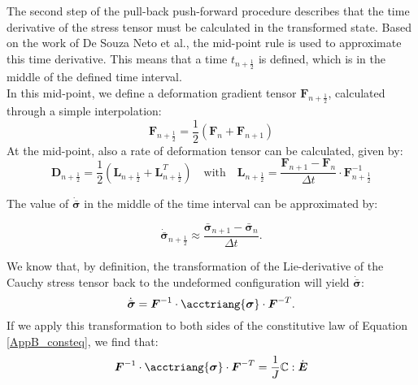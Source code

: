 {{The second step of the pull-back push-forward procedure describes that the time derivative of the stress tensor must be calculated in the transformed state.  Based on the work of De Souza Neto et al.\cite{compmethodsplasticity}{\color{red}{check this reference}}, the mid-point rule is used to approximate this time derivative. This means that a time $t_{n+\frac{1}{2}}$ is defined, which is in the middle of the defined time interval.\\
In this mid-point, we define a deformation gradient tensor $\boldsymbol{F}_{n+\frac{1}{2}}$, calculated through a simple interpolation:
\begin{equation}
\boldsymbol{F}_{n+\frac{1}{2}} = \frac{1}{2}(\boldsymbol{F}_{n}+\boldsymbol{F}_{n+1})
\end{equation}
At the mid-point, also a rate of deformation tensor can be calculated, given by:
\begin{equation}
\boldsymbol{D}_{n+\frac{1}{2}} = \frac{1}{2}(\boldsymbol{L}_{n+\frac{1}{2}}+\boldsymbol{L}_{n+\frac{1}{2}}^T)\quad\text{with}\quad \boldsymbol{L}_{n+\frac{1}{2}} = \frac{\boldsymbol{F}_{n+1}-\boldsymbol{F}_n}{\Delta t}\cdot \boldsymbol{F}_{n+\frac{1}{2}}^{-1}
\end{equation}

The value of $\dot{\bar{\boldsymbol{\sigma}}}$ in the middle of the time interval can be approximated by:
{\begin{equation}
\dot{\bar{\boldsymbol{\sigma}}}_{n+\frac{1}{2}}\approx\frac{\bar{\boldsymbol{\sigma}}_{n+1}-\bar{\boldsymbol{\sigma}}_{n}}{\Delta t}.
\end{equation}

We know that, by definition, the transformation of the Lie-derivative of the Cauchy stress tensor back to the undeformed configuration will yield $\dot{\bar{\boldsymbol{\sigma}}}$:
\begin{equation}
 \dot{\bar{\boldsymbol{\sigma}}}=\boldsymbol{F}^{-1}\cdot\acctriang{\boldsymbol{\sigma}}\cdot\boldsymbol{F}^{-T}.
\end{equation}
If we apply this transformation to both sides of the constitutive law of Equation \ref{AppB_consteq}, we find that:
\begin{equation}
\boldsymbol{F}^{-1}\cdot\acctriang{\boldsymbol{\sigma}}\cdot\boldsymbol{F}^{-T} = \frac{1}{J}\boldsymbol{\mathbb C}:\dot{\boldsymbol{E}}
\end{equation}



}}}
